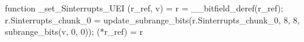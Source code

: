 function _set_Sinterrupts_UEI (r_ref, v) = {
    r = __bitfield_deref(r_ref);
    r.Sinterrupts_chunk_0 = update_subrange_bits(r.Sinterrupts_chunk_0, 8, 8, subrange_bits(v, 0, 0));
    (*r_ref) = r
}
